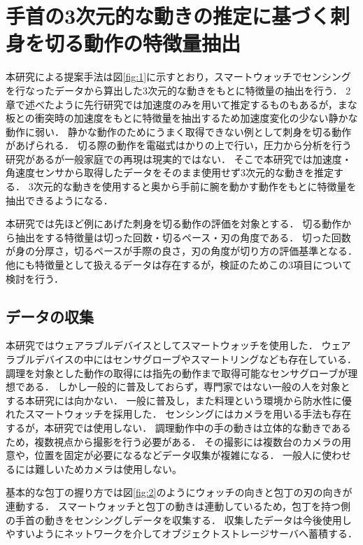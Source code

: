 \chapter{手首の3次元的な動きの推定に基づく刺身を切る動作の特徴量抽出}
本研究による提案手法は図\ref{fig:1}に示すとおり，スマートウォッチでセンシングを行なったデータから算出した3次元的な動きをもとに特徴量の抽出を行う．
2章で述べたように先行研究\cite{kumazawaanalysis}では加速度のみを用いて推定するものもあるが，まな板との衝突時の加速度をもとに特徴量を抽出するため加速度変化の少ない静かな動作に弱い．
静かな動作のためにうまく取得できない例として刺身を切る動作があげられる．
切る際の動作を電磁式はかりの上で行い，圧力から分析を行う研究\cite{切断操作が及ぼす食材へのダメージ評価}があるが一般家庭での再現は現実的ではない．
そこで本研究では加速度・角速度センサから取得したデータをそのまま使用せず3次元的な動きを推定する．
3次元的な動きを使用すると奥から手前に腕を動かす動作をもとに特徴量を抽出できるようになる．

本研究では先ほど例にあげた刺身を切る動作の評価を対象とする．
切る動作から抽出をする特徴量は切った回数・切るペース・刃の角度である．
切った回数が身の分厚さ，切るペースが手際の良さ，刃の角度が切り方の評価基準となる．
他にも特徴量として扱えるデータは存在するが，検証のためこの3項目について検討を行う．

\section{データの収集}
本研究ではウェアラブルデバイスとしてスマートウォッチを使用した．
ウェアラブルデバイスの中にはセンサグローブやスマートリングなども存在している．
調理を対象とした動作の取得には指先の動作まで取得可能なセンサグローブが理想である．
しかし一般的に普及しておらず，専門家ではない一般の人を対象とする本研究には向かない．
一般に普及し，また料理という環境から防水性に優れたスマートウォッチを採用した．
センシングにはカメラを用いる手法も存在するが，本研究では使用しない．
調理動作中の手の動きは立体的な動きであるため，複数視点から撮影を行う必要がある．
その撮影には複数台のカメラの用意や，位置を固定が必要になるなどデータ収集が複雑になる．
一般人に使わせるには難しいためカメラは使用しない。

基本的な包丁の握り方では図\ref{fig:2}のようにウォッチの向きと包丁の刃の向きが連動する．
スマートウォッチと包丁の動きは連動しているため，包丁を持つ側の手首の動きをセンシングしデータを収集する．
収集したデータは今後使用しやすいようにネットワークを介してオブジェクトストレージサーバへ蓄積する．
